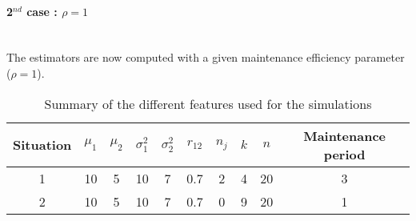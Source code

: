 %
%
%
%
%
%

\paragraph{2$^{nd}$ case : $\rho=1$}
~~\\

The estimators are now computed with a given maintenance efficiency parameter ($\rho=1$). 


\begin{table} [!h]
\caption{Summary of the different features used for the simulations}
\centering
\label{table:para_rho1}
\begin{tabular}{|c|c|c|c|c|c|c|c|c|c|}
\hline
Situation & $\mu_1$ & $\mu_2$ &  $\sigma_1^2$  &  $\sigma_2^2$  & $r_{12}$ & $n_j$ & $k$ & $n$  & Maintenance period\\
\hline
1& 10&5&10&7&0.7&2&4&20&3\\
2&10&5&10&7&0.7&0&9&20&1 \\

\hline
\end{tabular}
\end{table}


